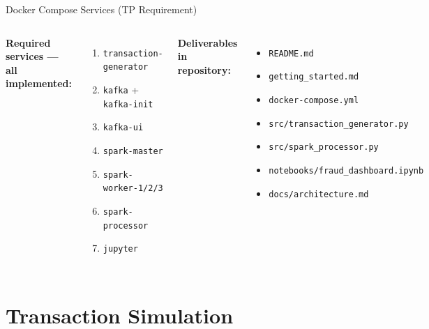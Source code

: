 \documentclass[aspectratio=169,11pt]{beamer}
\begin{document}
\begin{frame}{Docker Compose Services (TP Requirement)}
  \begin{columns}[T]
    \textbf{Required services — all implemented:}
    \begin{enumerate}
      \item \texttt{transaction-generator}
      \item \texttt{kafka} + \texttt{kafka-init}
      \item \texttt{kafka-ui}
      \item \texttt{spark-master}
      \item \texttt{spark-worker-1/2/3}
      \item \texttt{spark-processor}
      \item \texttt{jupyter}
    \end{enumerate}
    \textbf{Deliverables in repository:}
    \begin{itemize}
      \item \texttt{README.md}
      \item \texttt{getting\_started.md}
      \item \texttt{docker-compose.yml}
      \item \texttt{src/transaction\_generator.py}
      \item \texttt{src/spark\_processor.py}
      \item \texttt{notebooks/fraud\_dashboard.ipynb}
      \item \texttt{docs/architecture.md}
    \end{itemize}
  \end{columns}
\end{frame}

\section{Transaction Simulation}
\end{document}
